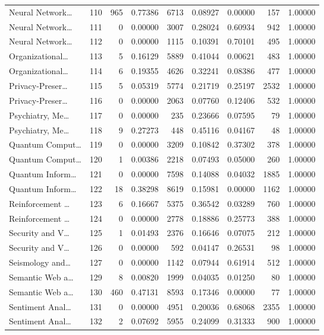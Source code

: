 \begin{table}
\begin{tabular}{lrrrrrrrr}
Neural Network… & 110 & 965 & 0.77386 & 6713 & 0.08927 & 0.00000 & 157 & 1.00000 \\
Neural Network… & 111 & 0 & 0.00000 & 3007 & 0.28024 & 0.60934 & 942 & 1.00000 \\
Neural Network… & 112 & 0 & 0.00000 & 1115 & 0.10391 & 0.70101 & 495 & 1.00000 \\
Organizational… & 113 & 5 & 0.16129 & 5889 & 0.41044 & 0.00621 & 483 & 1.00000 \\
Organizational… & 114 & 6 & 0.19355 & 4626 & 0.32241 & 0.08386 & 477 & 1.00000 \\
Privacy-Preser… & 115 & 5 & 0.05319 & 5774 & 0.21719 & 0.25197 & 2532 & 1.00000 \\
Privacy-Preser… & 116 & 0 & 0.00000 & 2063 & 0.07760 & 0.12406 & 532 & 1.00000 \\
Psychiatry, Me… & 117 & 0 & 0.00000 & 235 & 0.23666 & 0.07595 & 79 & 1.00000 \\
Psychiatry, Me… & 118 & 9 & 0.27273 & 448 & 0.45116 & 0.04167 & 48 & 1.00000 \\
Quantum Comput… & 119 & 0 & 0.00000 & 3209 & 0.10842 & 0.37302 & 378 & 1.00000 \\
Quantum Comput… & 120 & 1 & 0.00386 & 2218 & 0.07493 & 0.05000 & 260 & 1.00000 \\
Quantum Inform… & 121 & 0 & 0.00000 & 7598 & 0.14088 & 0.04032 & 1885 & 1.00000 \\
Quantum Inform… & 122 & 18 & 0.38298 & 8619 & 0.15981 & 0.00000 & 1162 & 1.00000 \\
Reinforcement … & 123 & 6 & 0.16667 & 5375 & 0.36542 & 0.03289 & 760 & 1.00000 \\
Reinforcement … & 124 & 0 & 0.00000 & 2778 & 0.18886 & 0.25773 & 388 & 1.00000 \\
Security and V… & 125 & 1 & 0.01493 & 2376 & 0.16646 & 0.07075 & 212 & 1.00000 \\
Security and V… & 126 & 0 & 0.00000 & 592 & 0.04147 & 0.26531 & 98 & 1.00000 \\
Seismology and… & 127 & 0 & 0.00000 & 1142 & 0.07944 & 0.61914 & 512 & 1.00000 \\
Semantic Web a… & 129 & 8 & 0.00820 & 1999 & 0.04035 & 0.01250 & 80 & 1.00000 \\
Semantic Web a… & 130 & 460 & 0.47131 & 8593 & 0.17346 & 0.00000 & 77 & 1.00000 \\
Sentiment Anal… & 131 & 0 & 0.00000 & 4951 & 0.20036 & 0.68068 & 2355 & 1.00000 \\
Sentiment Anal… & 132 & 2 & 0.07692 & 5955 & 0.24099 & 0.31333 & 900 & 1.00000 \\

\end{tabular}
\end{table}
